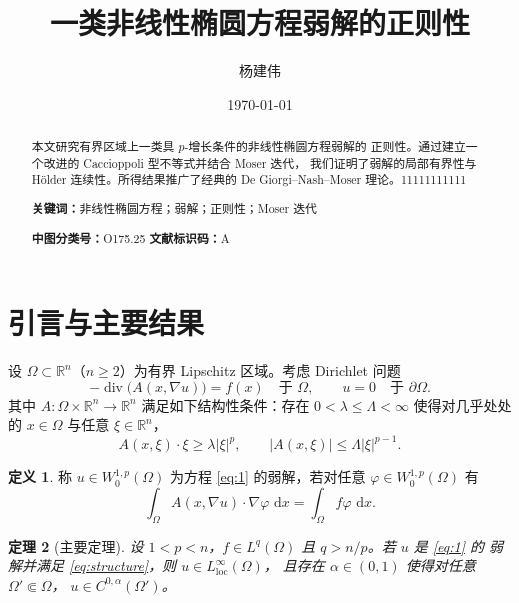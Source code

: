 \documentclass[12pt,a4paper,UTF8,fontset=fandol]{ctexart}
\title{一类非线性椭圆方程弱解的正则性}
\author{杨建伟}
\date{\today}
\newtheorem{theorem}{定理}[section]
\theoremstyle{definition}
\newtheorem{definition}[theorem]{定义}
\theoremstyle{remark}
\newcommand{\R}{\mathbb{R}}
\newcommand{\Om}{\Omega}
\newcommand{\paOm}{\partial\Omega}
\newcommand{\dd}{\,\mathrm{d}}
\DeclareMathOperator{\divg}{div}
\begin{document}
\maketitle

\begin{abstract}
\noindent 本文研究有界区域上一类具 $p$-增长条件的非线性椭圆方程弱解的
正则性。通过建立一个改进的 Caccioppoli 型不等式并结合 Moser 迭代，
我们证明了弱解的局部有界性与 Hölder 连续性。所得结果推广了经典的
De Giorgi--Nash--Moser 理论。11111111111

\smallskip
\noindent\textbf{关键词：}非线性椭圆方程；弱解；正则性；Moser 迭代

\smallskip
\noindent\textbf{中图分类号：}O175.25 \quad \textbf{文献标识码：}A
\end{abstract}

\section{引言与主要结果}

设 $\Om\subset\R^n$（$n\ge2$）为有界 Lipschitz 区域。考虑 Dirichlet 问题
\begin{equation}\label{eq:1}
  -\divg\bigl(A(x,\nabla u)\bigr)=f(x) \quad \text{于 } \Om,
  \qquad u=0 \quad \text{于 } \paOm .
\end{equation}
其中 $A:\Om\times\R^n\to\R^n$ 满足如下结构性条件：存在
$0<\lambda\le\Lambda<\infty$ 使得对几乎处处的 $x\in\Om$ 与任意
$\xi\in\R^n$，
\begin{equation}\label{eq:structure}
  A(x,\xi)\cdot\xi \ge \lambda|\xi|^p, \qquad
  |A(x,\xi)| \le \Lambda|\xi|^{p-1}.
\end{equation}

\begin{definition}\label{def:weak}
称 $u\in W^{1,p}_0(\Om)$ 为方程 \eqref{eq:1} 的弱解，若对任意
$\varphi\in W^{1,p}_0(\Om)$ 有
\begin{equation}
  \int_{\Om}A(x,\nabla u)\cdot\nabla\varphi\,\dd x
  = \int_{\Om} f\varphi\,\dd x .
\end{equation}
\end{definition}

\begin{theorem}[主要定理]\label{thm:main}
设 $1<p<n$，$f\in L^q(\Om)$ 且 $q>n/p$。若 $u$ 是 \eqref{eq:1} 的
弱解并满足 \eqref{eq:structure}，则 $u\in L^\infty_{\mathrm{loc}}(\Om)$，
且存在 $\alpha\in(0,1)$ 使得对任意 $\Om'\Subset\Om$，
$u\in C^{0,\alpha}(\Om')$。
\end{theorem}
\end{document}
